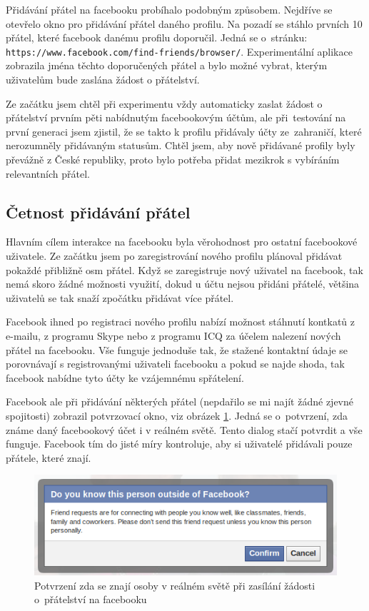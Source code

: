 \documentclass[thesis=M,czech]{FITthesis}[2013/05/10]
\begin{document}
Přidávání přátel na facebooku probíhalo podobným způsobem. Nejdříve se otevřelo okno pro přidávání přátel daného profilu. Na pozadí se stáhlo prvních 10 přátel, které facebook danému profilu doporučil. Jedná se o~stránku: \verb|https://www.facebook.com/find-friends/browser/|. Experimentální aplikace zobrazila jména těchto doporučených přátel a bylo možné vybrat, kterým uživatelům bude zaslána žádost o přátelství. 

Ze začátku jsem chtěl při experimentu vždy automaticky zaslat žádost o přátelství prvním pěti nabídnutým facebookovým účtům, ale při~testování na první generaci jsem zjistil, že se takto k profilu přidávaly účty ze~zahraničí, které nerozumněly přidávaným statusům. Chtěl jsem, aby nově přidávané profily byly převážně z České republiky, proto bylo potřeba přidat mezikrok s vybíráním relevantních přátel.

\subsection{Četnost přidávání přátel}

Hlavním cílem interakce na facebooku byla věrohodnost pro ostatní facebookové uživatele. Ze začátku jsem po zaregistrování nového profilu plánoval přidávat pokaždé přibližně osm přátel. Když se zaregistruje nový uživatel na facebook, tak nemá skoro žádné možnosti využití, dokud u účtu nejsou přidáni přátelé, většina uživatelů se tak snaží zpočátku přidávat více přátel. 

Facebook ihned po registraci nového profilu nabízí možnost stáhnutí kontkatů z e-mailu, z programu Skype nebo z programu ICQ za účelem nalezení nových přátel na facebooku. Vše funguje jednoduše tak, že stažené kontaktní údaje se porovnávají s registrovanými uživateli facebooku a pokud se najde shoda, tak facebook nabídne tyto účty ke vzájemnému spřátelení.

Facebook ale při přidávání některých přátel (nepdařilo se mi najít žádné zjevné spojitosti) zobrazil potvrzovací okno, viz obrázek \ref{fig:confirmFriendship}. Jedná se o~potvrzení, zda známe daný facebookový účet i v reálném světě. Tento dialog stačí potvrdit a vše funguje. Facebook tím do jisté míry kontroluje, aby si uživatelé přidávali pouze přátele, které znají.

\begin{figure}[h]
\begin{center}
\includegraphics[width=5in]{figures/confirm-friendship.png}
\caption{Potvrzení zda se znají osoby v reálném světě při zasílání žádosti o~přátelství na facebooku}
\label{fig:confirmFriendship}
\end{center}
\end{figure}
\end{document}
